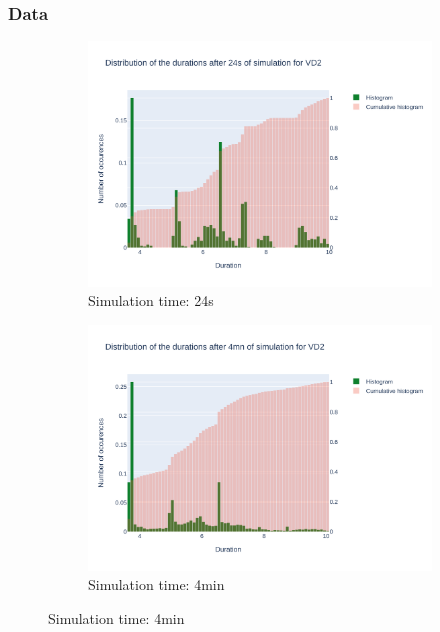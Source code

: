 \documentclass{article}
\begin{document}
\subsubsection{Data}

\begin{figure}[H]
    \centering
    \begin{subfigure}{.495\textwidth}
        \centering
        \includegraphics[width=\textwidth]{../fig/data/VD2_24s.png}
        \caption{Simulation time: 24s}
        \vspace{.5cm}
    \end{subfigure}
    \begin{subfigure}{.495\textwidth}
        \centering
        \includegraphics[width=\textwidth]{../fig/data/VD2_4mn.png}
        \caption{Simulation time: 4min}

\end{subfigure}
\end{figure}
\end{document}
